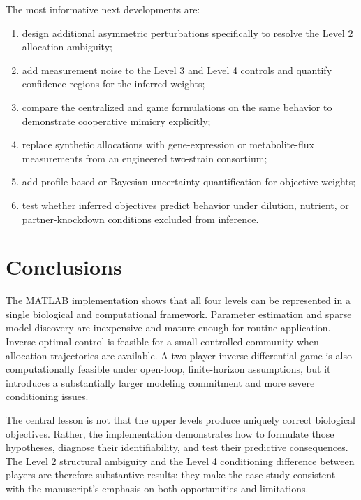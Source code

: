 \documentclass[11pt,a4paper]{article}
\begin{document}
The most informative next developments are:
\begin{enumerate}
  \item design additional asymmetric perturbations specifically to resolve
        the Level 2 allocation ambiguity;
  \item add measurement noise to the Level 3 and Level 4 controls and quantify
        confidence regions for the inferred weights;
  \item compare the centralized and game formulations on the same behavior to
        demonstrate cooperative mimicry explicitly;
  \item replace synthetic allocations with gene-expression or metabolite-flux
        measurements from an engineered two-strain consortium;
  \item add profile-based or Bayesian uncertainty quantification for objective
        weights;
  \item test whether inferred objectives predict behavior under dilution,
        nutrient, or partner-knockdown conditions excluded from inference.
\end{enumerate}

\section{Conclusions}

The MATLAB implementation shows that all four levels can be represented in a
single biological and computational framework. Parameter estimation and sparse
model discovery are inexpensive and mature enough for routine application.
Inverse optimal control is feasible for a small controlled community when
allocation trajectories are available. A two-player inverse differential game
is also computationally feasible under open-loop, finite-horizon assumptions,
but it introduces a substantially larger modeling commitment and more severe
conditioning issues.

The central lesson is not that the upper levels produce uniquely correct
biological objectives. Rather, the implementation demonstrates how to formulate
those hypotheses, diagnose their identifiability, and test their predictive
consequences. The Level 2 structural ambiguity and the Level 4 conditioning
difference between players are therefore substantive results: they make the
case study consistent with the manuscript's emphasis on both opportunities and
limitations.
\end{document}
